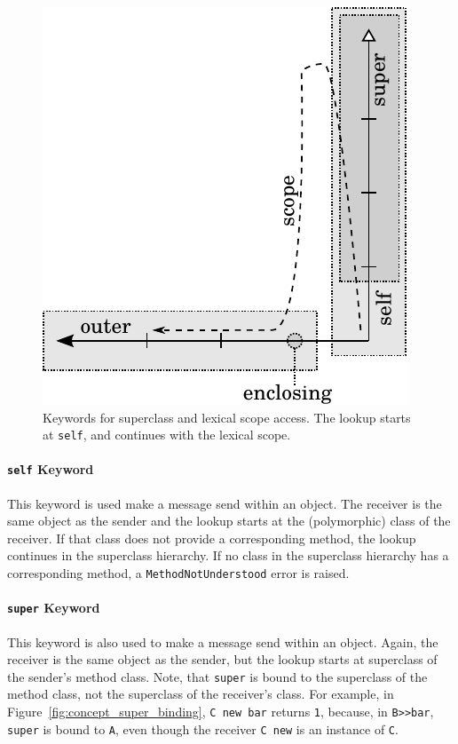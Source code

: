 \begin{figure}[!htp]
	\centering
	\includegraphics[scale=1]{lookup_keywords.pdf}
	\caption[Keywords for superclass and lexical scope access]{Keywords for superclass and lexical scope access. The lookup starts at \texttt{self}, and continues with the lexical scope.}
	\label{fig:concept_keywords}
\end{figure}

\paragraph{\texttt{self} Keyword}
This keyword is used make a message send within an object. The receiver is the same object as the sender and the lookup starts at the (polymorphic) class of the receiver. If that class does not provide a corresponding method, the lookup continues in the superclass hierarchy. If no class in the superclass hierarchy has a corresponding method, a \texttt{MethodNotUnderstood} error is raised.

\paragraph{\texttt{super} Keyword}
This keyword is also used to make a message send within an object. Again, the receiver is the same object as the sender, but the lookup starts at superclass of the sender's method class. Note, that \texttt{super} is bound to the superclass of the method class, not the superclass of the receiver's class. For example, in Figure~\ref{fig:concept_super_binding}, \texttt{C new bar} returns \texttt{1}, because, in \texttt{B>>bar}, \texttt{super} is bound to \texttt{A}, even though the receiver \texttt{C new} is an instance of \texttt{C}.

